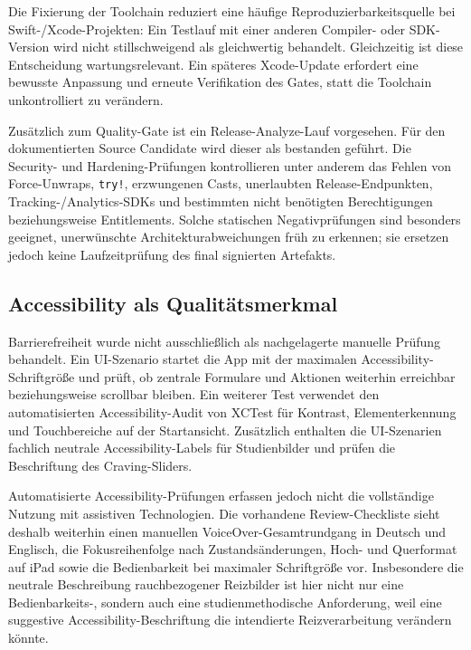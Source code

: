 \begin{neu}
Die Fixierung der Toolchain reduziert eine häufige Reproduzierbarkeitsquelle bei Swift-/Xcode-Projekten: Ein Testlauf mit einer anderen Compiler- oder SDK-Version wird nicht stillschweigend als gleichwertig behandelt. Gleichzeitig ist diese Entscheidung wartungsrelevant. Ein späteres Xcode-Update erfordert eine bewusste Anpassung und erneute Verifikation des Gates, statt die Toolchain unkontrolliert zu verändern.

Zusätzlich zum Quality-Gate ist ein Release-Analyze-Lauf vorgesehen. Für den dokumentierten Source Candidate wird dieser als bestanden geführt. Die Security- und Hardening-Prüfungen kontrollieren unter anderem das Fehlen von Force-Unwraps, \texttt{try!}, erzwungenen Casts, unerlaubten Release-Endpunkten, Tracking-/Analytics-SDKs und bestimmten nicht benötigten Berechtigungen beziehungsweise Entitlements. Solche statischen Negativprüfungen sind besonders geeignet, unerwünschte Architekturabweichungen früh zu erkennen; sie ersetzen jedoch keine Laufzeitprüfung des final signierten Artefakts.

\subsection{Accessibility als Qualitätsmerkmal}

Barrierefreiheit wurde nicht ausschließlich als nachgelagerte manuelle Prüfung behandelt. Ein UI-Szenario startet die App mit der maximalen Accessibility-Schriftgröße und prüft, ob zentrale Formulare und Aktionen weiterhin erreichbar beziehungsweise scrollbar bleiben. Ein weiterer Test verwendet den automatisierten Accessibility-Audit von XCTest für Kontrast, Elementerkennung und Touchbereiche auf der Startansicht. Zusätzlich enthalten die UI-Szenarien fachlich neutrale Accessibility-Labels für Studienbilder und prüfen die Beschriftung des Craving-Sliders.

Automatisierte Accessibility-Prüfungen erfassen jedoch nicht die vollständige Nutzung mit assistiven Technologien. Die vorhandene Review-Checkliste sieht deshalb weiterhin einen manuellen VoiceOver-Gesamtrundgang in Deutsch und Englisch, die Fokusreihenfolge nach Zustandsänderungen, Hoch- und Querformat auf iPad sowie die Bedienbarkeit bei maximaler Schriftgröße vor. Insbesondere die neutrale Beschreibung rauchbezogener Reizbilder ist hier nicht nur eine Bedienbarkeits-, sondern auch eine studienmethodische Anforderung, weil eine suggestive Accessibility-Beschriftung die intendierte Reizverarbeitung verändern könnte.


\end{neu}
